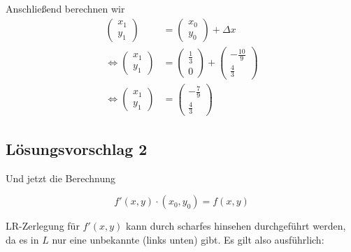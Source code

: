 Anschließend berechnen wir
\begin{align}
	\begin{pmatrix}
		x_1\\
		y_1
	\end{pmatrix} &= 
	\begin{pmatrix}
		x_0\\
		y_0
	\end{pmatrix}+\Delta x \\
	\Leftrightarrow\begin{pmatrix}
		x_1\\
		y_1
	\end{pmatrix} &= 
	\begin{pmatrix}
		\frac{1}{3}\\
		0
	\end{pmatrix} +
	\begin{pmatrix}
		-\frac{10}{9}\\
		\frac{4}{3}
	\end{pmatrix} \\
	\Leftrightarrow\begin{pmatrix}
		x_1\\
		y_1
	\end{pmatrix} &= 
	\begin{pmatrix}
		-\frac{7}{9}\\
		\frac{4}{3}
	\end{pmatrix}
\end{align}


\subsection*{Lösungsvorschlag 2}
Und jetzt die Berechnung %

\[f'(x, y) \cdot (x_0, y_0) = f(x,y)\] %

LR-Zerlegung für $f'(x, y)$ kann durch scharfes hinsehen durchgeführt
werden, da es in $L$ nur eine unbekannte (links unten) gibt. Es gilt
also ausführlich:

